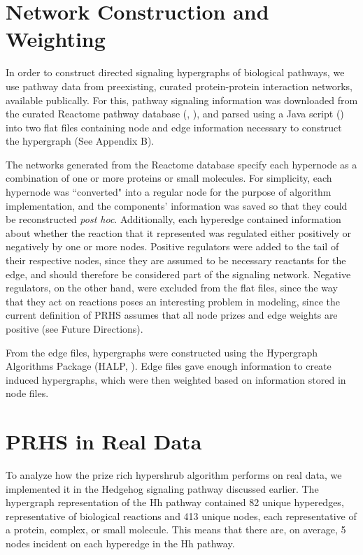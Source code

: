 \documentclass[12pt,twoside]{reedthesis}
\theoremstyle{definition}
\begin{document}
  \section{Network Construction and Weighting}
  In order to construct directed signaling hypergraphs of biological pathways, we use pathway data from preexisting, curated protein-protein interaction networks, available publically. For this, pathway signaling information was downloaded from the curated Reactome pathway database (\cite{Croft2014}, \cite{Milacic2012}), and parsed using a Java script (\cite{AnnaCorrespondence}) into two flat files containing node and edge information necessary to construct the hypergraph (See Appendix B).\par
  The networks generated from the Reactome database specify each hypernode as a combination of one or more proteins or small molecules. For simplicity, each hypernode was ``converted" into a regular node for the purpose of algorithm implementation, and the components' information was saved so that they could be reconstructed \textit{post hoc}. Additionally, each hyperedge contained information about whether the reaction that it represented was regulated either positively or negatively by one or more nodes. Positive regulators were added to the tail of their respective nodes, since they are assumed to be necessary reactants for the edge, and should therefore be considered part of the signaling network. Negative regulators, on the other hand, were excluded from the flat files, since the way that they act on reactions poses an interesting problem in modeling, since the current definition of PRHS assumes that all node prizes and edge weights are positive (see Future Directions).\par
  From the edge files, hypergraphs were constructed using the Hypergraph Algorithms Package (HALP, \cite{halp}). Edge files gave enough information to create induced hypergraphs, which were then weighted based on information stored in node files.\par

  \section{PRHS in Real Data}
  To analyze how the prize rich hypershrub algorithm performs on real data, we implemented it in the Hedgehog signaling pathway discussed earlier. The hypergraph representation of the Hh pathway contained 82 unique hyperedges, representative of biological reactions and 413 unique nodes, each representative of a protein, complex, or small molecule. This means that there are, on average, 5 nodes incident on each hyperedge in the Hh pathway.
\end{document}
